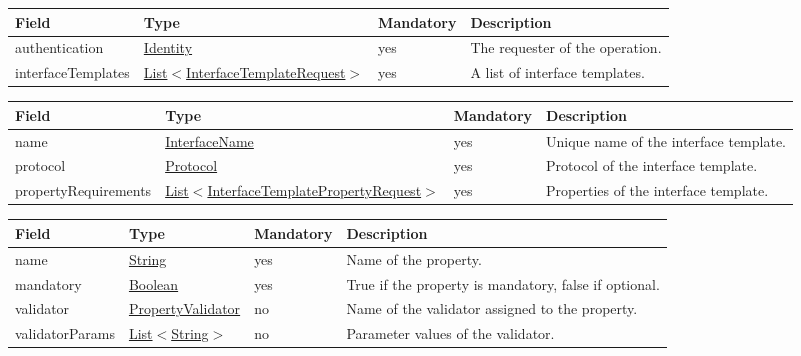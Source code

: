 \documentclass[a4paper]{arrowhead}
\newcommand{\pref}[1]{{\textcolor{ArrowheadGrey}{\hyperref[sec:model:primitives:#1]{#1}}}}
\begin{document}
 
\begin{table}[ht!]
\begin{tabularx}{\textwidth}{| p{3cm} | p{5.1cm} | p{2cm} | X |} \hline
\rowcolor{gray!33} Field & Type & Mandatory & Description \\ \hline
authentication & \hyperref[sec:model:Identity]{Identity} & yes & The requester of the operation. \\ \hline
interfaceTemplates & \pref{List}$<$\hyperref[sec:model:InterfaceTemplateRequest]{InterfaceTemplateRequest}$>$ & yes & A list of interface templates. \\ \hline
\end{tabularx}
\end{table}

\clearpage


\begin{table}[ht!]
\begin{tabularx}{\textwidth}{| p{3.7cm} | p{6.4cm} | p{2cm} | X |} \hline
\rowcolor{gray!33} Field & Type & Mandatory & Description \\ \hline
name & \pref{InterfaceName} & yes & Unique name of the interface template. \\ \hline
protocol & \pref{Protocol} & yes & Protocol of the interface template. \\ \hline
propertyRequirements &  \pref{List}$<$\hyperref[sec:model:InterfaceTemplatePropertyRequest]{InterfaceTemplatePropertyRequest}$>$ & yes & Properties of the interface template. \\ \hline
\end{tabularx}
\end{table}



\begin{table}[ht!]
\begin{tabularx}{\textwidth}{| p{2.5cm} | p{2.7cm} | p{2cm} | X |} \hline
\rowcolor{gray!33} Field & Type & Mandatory & Description \\ \hline

name & \pref{String} & yes & Name of the property. \\ \hline
mandatory & \pref{Boolean} & yes & True if the property is mandatory, false if optional. \\ \hline
validator & \pref{PropertyValidator} & no & Name of the validator assigned to the property. \\ \hline
validatorParams & \pref{List}$<$\pref{String}$>$ & no & Parameter values of the validator. \\ \hline
\end{tabularx}
\end{table}
\end{document}
